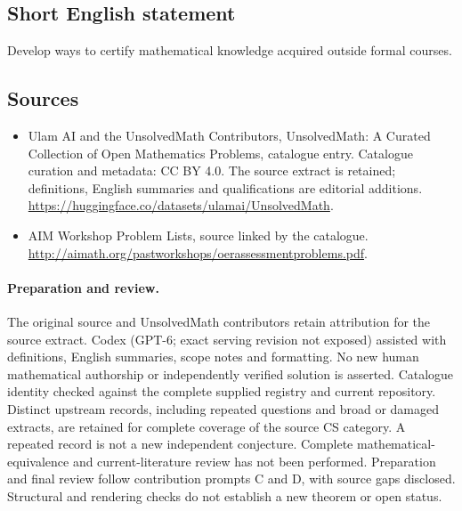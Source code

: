 \documentclass[11pt]{article}
\begin{document}
\subsection{Short English statement}
Develop ways to certify mathematical knowledge acquired outside formal courses.
\subsection{Sources}
\begin{itemize}
\item[\hypertarget{source:statement:1}{S1}] Ulam AI and the UnsolvedMath Contributors, UnsolvedMath: A Curated Collection of Open Mathematics Problems, catalogue entry. Catalogue curation and metadata: CC BY 4.0. The source extract is retained; definitions, English summaries and qualifications are editorial additions.
\url{https://huggingface.co/datasets/ulamai/UnsolvedMath}.
\item[\hypertarget{source:statement:2}{S2}] AIM Workshop Problem Lists, source linked by the catalogue.
\url{http://aimath.org/pastworkshops/oerassessmentproblems.pdf}.
\end{itemize}
\paragraph{Preparation and review.}
The original source and UnsolvedMath contributors retain attribution for the source extract. Codex (GPT-6; exact serving revision not exposed) assisted with definitions, English summaries, scope notes and formatting. No new human mathematical authorship or independently verified solution is asserted. Catalogue identity checked against the complete supplied registry and current repository. Distinct upstream records, including repeated questions and broad or damaged extracts, are retained for complete coverage of the source CS category. A repeated record is not a new independent conjecture. Complete mathematical-equivalence and current-literature review has not been performed. Preparation and final review follow contribution prompts C and D, with source gaps disclosed. Structural and rendering checks do not establish a new theorem or open status.
\label{end:statement}
\end{document}
